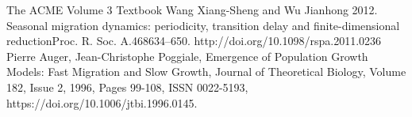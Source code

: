 \documentclass[11pt]{amsart}
\begin{document}
\FloatBarrier %
\newpage


\begin{thebibliography}{99}
 The ACME Volume 3 Textbook
 Wang Xiang-Sheng and Wu Jianhong 2012. Seasonal migration dynamics: periodicity, transition delay and finite-dimensional reductionProc. R. Soc. A.468634–650. http://doi.org/10.1098/rspa.2011.0236
 Pierre Auger, Jean-Christophe Poggiale, Emergence of Population Growth Models: Fast Migration and Slow Growth, Journal of Theoretical Biology, Volume 182, Issue 2, 1996, Pages 99-108, ISSN 0022-5193, https://doi.org/10.1006/jtbi.1996.0145.
\end{thebibliography}
\end{document}
